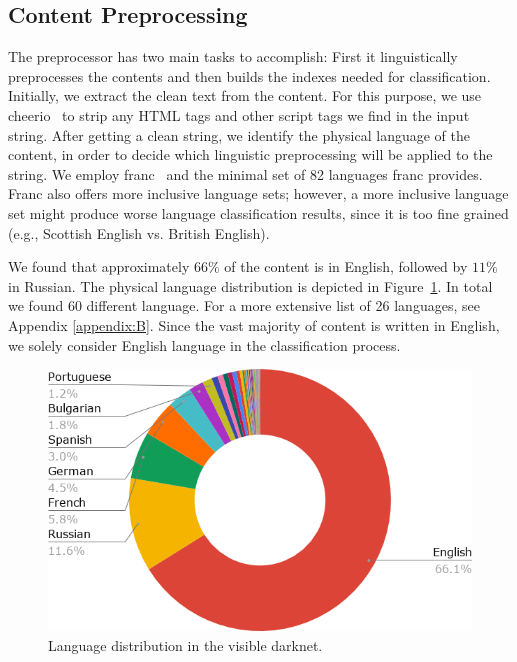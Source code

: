 \subsection{Content Preprocessing}
The preprocessor has two main tasks to accomplish: First it linguistically preprocesses the contents and then builds the indexes needed for classification. 
Initially, we extract the clean text from the content.
For this purpose, we use cheerio~\cite{cheeriojs} to strip any HTML tags and other script tags we find in the input string.
After getting a clean string, we identify the physical language of the content, in order to decide which linguistic preprocessing will be applied to the string.
We employ franc~\cite{WormerFranc} and the minimal set of 82 languages franc provides. Franc also offers more inclusive language sets; however, a more inclusive language set might produce worse language classification results, since it is too fine grained (e.g., Scottish English vs. British English).

We found that approximately $66\%$ of the content is in English, followed by $11\%$ in Russian. The physical language distribution is depicted in Figure~\ref{fig:languages}. In total we found 60 different language. For a more extensive list of 26 languages, see Appendix \ref{appendix:B}. Since the vast majority of content is written in English, we solely consider English language in the classification process.

\ifdgruyter
  \begin{figure}[H]
  \includegraphics[width=\linewidth]{images/contentsByLanguage.png}
  \caption{Language distribution in the visible darknet.}
  \label{fig:languages}
  \end{figure}
\fi

